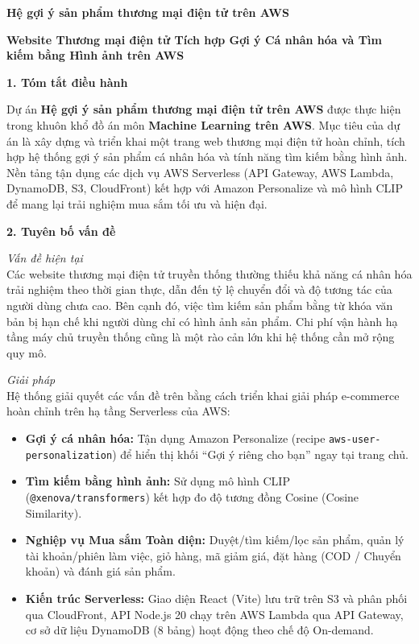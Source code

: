 \vspace{0.5em}\noindent\textbf{Hệ gợi ý sản phẩm thương mại điện tử trên
AWS}\par

\vspace{0.5em}\noindent\textbf{Website Thương mại điện tử Tích hợp Gợi ý Cá nhân hóa và Tìm
kiếm bằng Hình ảnh trên
AWS}\par

\vspace{0.5em}\noindent\textbf{1. Tóm tắt điều
hành}\par

Dự án \textbf{Hệ gợi ý sản phẩm thương mại điện tử trên AWS} được thực
hiện trong khuôn khổ đồ án môn \textbf{Machine Learning trên AWS}. Mục
tiêu của dự án là xây dựng và triển khai một trang web thương mại điện
tử hoàn chỉnh, tích hợp hệ thống gợi ý sản phẩm cá nhân hóa và tính năng
tìm kiếm bằng hình ảnh. Nền tảng tận dụng các dịch vụ AWS Serverless
(API Gateway, AWS Lambda, DynamoDB, S3, CloudFront) kết hợp với Amazon
Personalize và mô hình CLIP để mang lại trải nghiệm mua sắm tối ưu và
hiện đại.

\vspace{0.5em}\noindent\textbf{2. Tuyên bố vấn
đề}\par

\emph{Vấn đề hiện tại}\\
Các website thương mại điện tử truyền thống thường thiếu khả năng cá
nhân hóa trải nghiệm theo thời gian thực, dẫn đến tỷ lệ chuyển đổi và độ
tương tác của người dùng chưa cao. Bên cạnh đó, việc tìm kiếm sản phẩm
bằng từ khóa văn bản bị hạn chế khi người dùng chỉ có hình ảnh sản phẩm.
Chi phí vận hành hạ tầng máy chủ truyền thống cũng là một rào cản lớn
khi hệ thống cần mở rộng quy mô.

\emph{Giải pháp}\\
Hệ thống giải quyết các vấn đề trên bằng cách triển khai giải pháp
e-commerce hoàn chỉnh trên hạ tầng Serverless của AWS:

\begin{itemize}
\tightlist
\item
  \textbf{Gợi ý cá nhân hóa:} Tận dụng Amazon Personalize (recipe
  \texttt{aws-user-personalization}) để hiển thị khối ``Gợi ý riêng cho
  bạn'' ngay tại trang chủ.
\item
  \textbf{Tìm kiếm bằng hình ảnh:} Sử dụng mô hình CLIP
  (\texttt{@xenova/transformers}) kết hợp đo độ tương đồng Cosine
  (Cosine Similarity).
\item
  \textbf{Nghiệp vụ Mua sắm Toàn diện:} Duyệt/tìm kiếm/lọc sản phẩm,
  quản lý tài khoản/phiên làm việc, giỏ hàng, mã giảm giá, đặt hàng (COD
  / Chuyển khoản) và đánh giá sản phẩm.
\item
  \textbf{Kiến trúc Serverless:} Giao diện React (Vite) lưu trữ trên S3
  và phân phối qua CloudFront, API Node.js 20 chạy trên AWS Lambda qua
  API Gateway, cơ sở dữ liệu DynamoDB (8 bảng) hoạt động theo chế độ
  On-demand.
\end{itemize}

